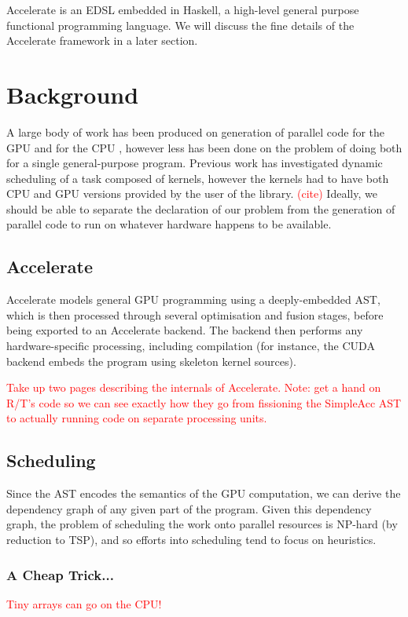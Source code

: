\documentclass[a4paper,12pt]{article}
\newcommand{\red}[1]{\textcolor{red}{#1}}
\begin{document}
Accelerate is an EDSL embedded in Haskell, a high-level general purpose functional programming language. 
We will discuss the fine details of the Accelerate framework in a later section.

\section{Background}

A large body of work has been produced on generation of parallel code for the GPU and for the CPU \citep{lee_transparent_2013}, however less has been done on the problem of doing both for a single general-purpose program. 
Previous work has investigated dynamic scheduling of a task composed of kernels, however the kernels had to have both CPU and GPU versions provided by the user of the library. 
\red{(cite)} 
Ideally, we should be able to separate the declaration of our problem from the generation of parallel code to run on whatever hardware happens to be available.

\subsection{Accelerate}

Accelerate models general GPU programming using a deeply-embedded AST, which is then processed through several optimisation and fusion stages, before being exported to an Accelerate backend. 
The backend then performs any hardware-specific processing, including compilation (for instance, the CUDA backend embeds the program using skeleton kernel sources).

\red{Take up two pages describing the internals of Accelerate. Note: get a hand on R/T's code so we can see exactly how they go from fissioning the SimpleAcc AST to actually running code on separate processing units.}


\subsection{Scheduling}

Since the AST encodes the semantics of the GPU computation, we can derive the dependency graph of any given part of the program. 
Given this dependency graph, the problem of scheduling the work onto parallel resources is NP-hard (by reduction to TSP), and so efforts into scheduling tend to focus on heuristics.

\subsubsection*{A Cheap Trick...}
\red{Tiny arrays can go on the CPU!}
\end{document}

